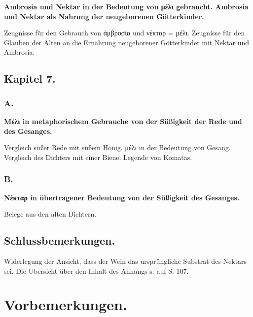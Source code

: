\documentclass[a4paper, 11pt, oneside]{article}
\begin{document}
\textbf{Ambrosia und Nektar in der Bedeutung von μέλι gebraucht. Ambrosia und Nektar als Nahrung der neugeborenen Götterkinder.}

Zeugnisse für den Gebrauch von ἀμβροσία und νέκταρ = μέλι. Zeugnisse für den Glauben der Alten an die Ernährung neugeborener Götterkinder mit Nektar und Ambrosia.

\subsection*{Kapitel 7.}

\subsubsection*{A.}

\textbf{Μέλι in metaphorischem Gebrauche von der Süßigkeit der Rede und des Gesanges.}

Vergleich süßer Rede mit süßem Honig. μέλι in der Bedeutung von Gesang. Vergleich des Dichters mit einer Biene. Legende von Komatas.

\subsubsection*{B.}

\textbf{Νέκταρ in übertragener Bedeutung von der Süßigkeit des Gesanges.}

Belege aus den alten Dichtern.

\subsection*{Schlussbemerkungen.}

Widerlegung der Ansicht, dass der Wein das ursprüngliche Substrat des Nektars sei. Die Übersicht über den Inhalt des Anhangs s. auf S. 107.
\clearpage
\section*{Vorbemerkungen.}
\end{document}

